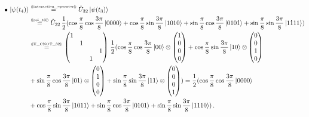 \documentclass[11pt]{article}
\numberwithin{equation}{section} %
\numberwithin{figure}{section} %
\newcommand\numeq[1] %
  {\stackrel{\scriptscriptstyle(\mkern-1.5mu#1\mkern-1.5mu)}{=}}
\begin{document}
\begin{appendices}
\vspace{0.15cm}
\begin{equation} \label{psi_t4}
\begin{split}
\bullet\,\ket{\psi(t_4)}
&	\numeq{\textrm{\ref{interaction_operator}}}  \hat{U}_{32}\ket{\psi(t_3)}\\
& \numeq{\textrm{\ref{psi_t3}}} \hat{U}_{32}\,\frac{1}{2} (\cos\frac{\pi}{8}\cos\frac{3\pi}{8}\ket{0000} + \cos\frac{\pi}{8}\sin\frac{3\pi}{8}\ket{1010} +\sin\frac{\pi}{8}\cos\frac{3\pi}{8}\ket{0101} +\sin\frac{\pi}{8}\sin\frac{3\pi}{8}\ket{1111})\\
&	\numeq{\textrm{\ref{U_CNOT_32}}} \begin{pmatrix} 1&&&\\ &1&&\\ &&&1\\ &&1&\end{pmatrix} \,\frac{1}{2} (\cos\frac{\pi}{8}\cos\frac{3\pi}{8}\ket{00}\otimes \begin{pmatrix}1\\0\\0\\0\end{pmatrix} + \cos\frac{\pi}{8}\sin\frac{3\pi}{8}\ket{10}\otimes \begin{pmatrix}0\\0\\1\\0\end{pmatrix} \\
&	+\sin\frac{\pi}{8}\cos\frac{3\pi}{8}\ket{01}\otimes \begin{pmatrix}0\\1\\0\\0\end{pmatrix}+\sin\frac{\pi}{8}\sin\frac{3\pi}{8}\ket{11}\otimes \begin{pmatrix}0\\0\\0\\1\end{pmatrix}) =\frac{1}{2} (\cos\frac{\pi}{8}\cos\frac{3\pi}{8}\ket{0000}\\
&	+ \cos\frac{\pi}{8}\sin\frac{3\pi}{8}\ket{1011} +\sin\frac{\pi}{8}\cos\frac{3\pi}{8}\ket{0101} +\sin\frac{\pi}{8}\sin\frac{3\pi}{8}\ket{1110})\,.
\end{split}
\end{equation}



\end{appendices}
\end{document}
